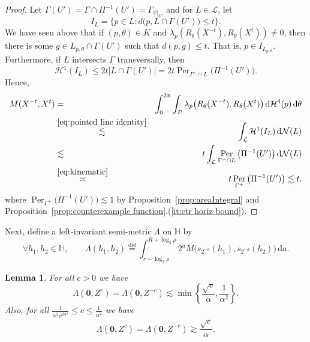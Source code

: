 \documentclass[11pt,reqno]{amsart}
\renewcommand{\H}{\mathbb{H}}
\newcommand{\cH}{\mathcal{H}}
\newcommand{\cL}{\mathcal{L}}
\newcommand{\cN}{\mathcal{N}}
\newcommand{\ud}[0]{\,\mathrm{d}}
\newcommand{\0}{\mathbf{0}}
\renewcommand{\1}{\mathbf 1}
\renewcommand{\mid}{:}
\newcommand{\eqdef}{\stackrel{\mathrm{def}}{=}}
\renewcommand{\le}{\leqslant}
\newtheorem{lemma}[thm]{Lemma}
\theoremstyle{remark}
\DeclareMathOperator{\Per}{Per}
\begin{document}
\begin{proof}
  Let $\Gamma(U')=\Gamma\cap \Pi^{-1}(U')=\Gamma_{\psi|_{U'}}$ and for $L\in \cL$, let
  $$I_{L}=\big\{p\in L\mid d\big(p,L \cap \Gamma(U')\big)\le t\big\}.$$
  We have seen above that if $(p,\theta)\in K$ and $\lambda_{p}(R_\theta(X^{-t}),R_\theta(X^t))\ne 0$, then there is some $g\in L_{p,\theta}\cap \Gamma(U')$ such that $d(p,g)\le t$. That is, $p\in I_{L_{p,\theta}}$. Furthermore, if $L$ intersects $\Gamma$ transversally, then
  $$\cH^1(I_L) \le 2t |L \cap \Gamma(U')| = 2t \Per_{\Gamma^+ \cap L}\big(\Pi^{-1}(U')\big).$$
  Hence,
  \begin{eqnarray*}
    M(X^{-t},X^t)&=&\int_{0}^{2\pi} \int_{P} \lambda_p\big(R_\theta(X^{-t}),R_\theta(X^t)\big) \ud\cH^4(p) \ud\theta\\
                 &\stackrel{\eqref{eq:pointed line identity}}{\lesssim}& \int_\cL \cH^1(I_L) \ud \cN(L) \\
                 &\lesssim& t \int_\cL \Per_{\Gamma^+ \cap L}\big(\Pi^{-1}(U')\big) \ud \cN(L) \\
                 &\stackrel{\eqref{eq:kinematic}}{\asymp}& t \Per_{\Gamma^+}\big(\Pi^{-1}(U')\big)\lesssim t.
  \end{eqnarray*}
  where $\Per_{\Gamma^+}\big(\Pi^{-1}(U')\big)\lesssim 1$ by Proposition~\ref{prop:areaIntegral} and Proposition~\ref{prop:counterexample function}.(\ref{it:ctr horiz bound}).
\end{proof}
  Next, define a left-invariant semi-metric $\Lambda$ on $\H$ by
  $$
  \forall  h_1,h_2\in \H,\qquad \Lambda(h_1,h_2)\eqdef \int_{r-\log_2\rho}^{R+\log_2\rho} 2^{a} M\big(s_{2^{-a}}(h_1), s_{2^{-a}}(h_2)\big) \ud a.
  $$

  \begin{lemma}\label{lem:Lambda on center} For all $c>0$ we have  $$\Lambda(\0,Z^c)=\Lambda(\0,Z^{-c})\lesssim \min\left\{\frac{\sqrt{c}}{\alpha},\frac{1}{\alpha^2}\right\}.$$
 Also, for all   $\frac{1}{\alpha^{2}\rho^{2\alpha^4}}\le c\le \frac{1}{\alpha^{2}}$ we have
   $$
   \Lambda(\0,Z^c)=\Lambda(\0,Z^{-c})\gtrsim \frac{\sqrt{c}}{\alpha}.$$
  \end{lemma}
\end{document}
